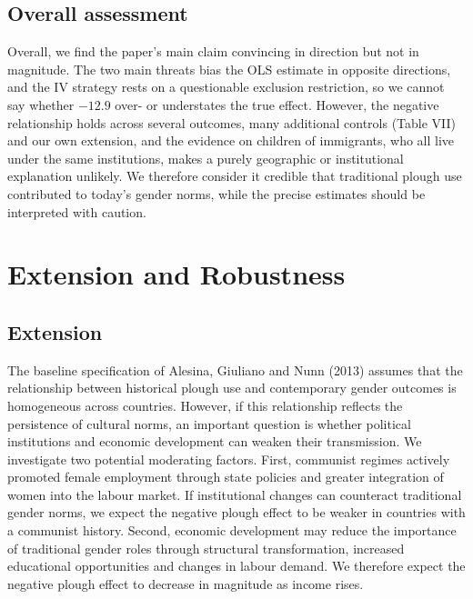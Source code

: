 \documentclass[12pt,a4paper]{article}
\begin{document}
\subsection{Overall assessment}

Overall, we find the paper's main claim convincing in direction but not in magnitude. The two main threats bias the OLS estimate in opposite directions, and the IV strategy rests on a questionable exclusion restriction, so we cannot say whether $-12.9$ over- or understates the true effect. However, the negative relationship holds across several outcomes, many additional controls (Table VII) and our own extension, and the evidence on children of immigrants, who all live under the same institutions, makes a purely geographic or institutional explanation unlikely. We therefore consider it credible that traditional plough use contributed to today's gender norms, while the precise estimates should be interpreted with caution.

\section{Extension and Robustness}
 \subsection{Extension}

The baseline specification of Alesina, Giuliano and Nunn (2013) assumes that the relationship between historical plough use and contemporary gender outcomes is homogeneous across countries. However, if this relationship reflects the persistence of cultural norms, an important question is whether political institutions and economic development can weaken their transmission. We investigate two potential moderating factors. First, communist regimes actively promoted female employment through state policies and greater integration of women into the labour market. If institutional changes can counteract traditional gender norms, we expect the negative plough effect to be weaker in countries with a communist history. Second, economic development may reduce the importance of traditional gender roles through structural transformation, increased educational opportunities and changes in labour demand. We therefore expect the negative plough effect to decrease in magnitude as income rises.
\end{document}
